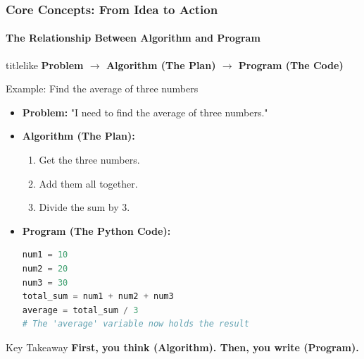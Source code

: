 \documentclass{beamer}
\begin{document}
\begin{frame}[fragile]
    \frametitle{Core Concepts: From Idea to Action}
    \framesubtitle{The Relationship Between Algorithm and Program}
    
    \begin{beamercolorbox}[sep=1em,center]{titlelike}
        \Large \textbf{Problem $\rightarrow$ Algorithm (The Plan) $\rightarrow$ Program (The Code)}
    \end{beamercolorbox}
    
    \vspace{1em}
    
    \begin{block}{Example: Find the average of three numbers}
        \begin{itemize}
            \item \textbf{Problem:} "I need to find the average of three numbers."
            \item \textbf{Algorithm (The Plan):}
            \begin{enumerate}
                \item Get the three numbers.
                \item Add them all together.
                \item Divide the sum by 3.
            \end{enumerate}
            \item \textbf{Program (The Python Code):}
            \begin{lstlisting}[language=Python]
num1 = 10
num2 = 20
num3 = 30
total_sum = num1 + num2 + num3
average = total_sum / 3
# The 'average' variable now holds the result
            \end{lstlisting}
        \end{itemize}
    \end{block}
    
    \begin{alertblock}{Key Takeaway}
        \centering
        \textbf{First, you think (Algorithm). Then, you write (Program).}
    \end{alertblock}
\end{frame}
\end{document}
